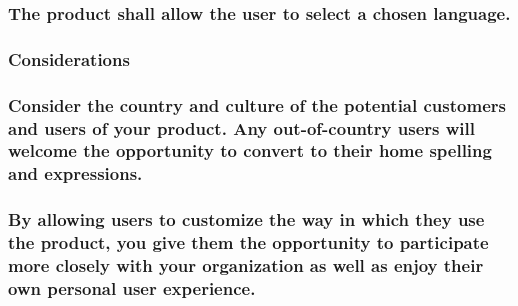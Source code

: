 \documentclass[
]{article}
\begin{document}
\hypertarget{the-product-shall-allow-the-user-to-select-a-chosen-language.}{%
\subsubsection{The product shall allow the user to select a chosen
language.}\label{the-product-shall-allow-the-user-to-select-a-chosen-language.}}

\hypertarget{considerations-21}{%
\subsubsection{Considerations}\label{considerations-21}}

\hypertarget{consider-the-country-and-culture-of-the-potential-customers-and-users-of-your-product.-any-out-of-country-users-will-welcome-the-opportunity-to-convert-to-their-home-spelling-and-expressions.}{%
\subsubsection{Consider the country and culture of the potential
customers and users of your product. Any out-of-country users will
welcome the opportunity to convert to their home spelling and
expressions.}\label{consider-the-country-and-culture-of-the-potential-customers-and-users-of-your-product.-any-out-of-country-users-will-welcome-the-opportunity-to-convert-to-their-home-spelling-and-expressions.}}

\hypertarget{by-allowing-users-to-customize-the-way-in-which-they-use-the-product-you-give-them-the-opportunity-to-participate-more-closely-with-your-organization-as-well-as-enjoy-their-own-personal-user-experience.}{%
\subsubsection{\texorpdfstring{By allowing users to customize the way in
which they use the product, you give them the opportunity to participate
more closely with your organization as well as enjoy their own personal
user experience.
}{By allowing users to customize the way in which they use the product, you give them the opportunity to participate more closely with your organization as well as enjoy their own personal user experience. }}\label{by-allowing-users-to-customize-the-way-in-which-they-use-the-product-you-give-them-the-opportunity-to-participate-more-closely-with-your-organization-as-well-as-enjoy-their-own-personal-user-experience.}}
\end{document}
